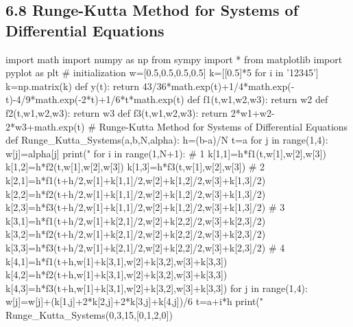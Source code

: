 \documentclass{article}
\begin{document}
\subsection{6.8 Runge-Kutta Method for Systems of Differential Equations}
\begin{python}
import math
import numpy as np
from sympy import *
from matplotlib import pyplot as plt
# initialization
w=[0.5,0.5,0.5,0.5]
k=[[0.5]*5 for i in '12345']
k=np.matrix(k)
def y(t):
    return 43/36*math.exp(t)+1/4*math.exp(-t)-4/9*math.exp(-2*t)+1/6*t*math.exp(t)
def f1(t,w1,w2,w3):
    return w2
def f2(t,w1,w2,w3):
    return w3
def f3(t,w1,w2,w3):
    return 2*w1+w2-2*w3+math.exp(t)
# Runge-Kutta Method for Systems of Differential Equations
def Runge_Kutta_Systems(a,b,N,alpha):
    h=(b-a)/N 
    t=a
    for j in range(1,4):
        w[j]=alpha[j]
    print("%
    for i in range(1,N+1):
        # 1
        k[1,1]=h*f1(t,w[1],w[2],w[3])
        k[1,2]=h*f2(t,w[1],w[2],w[3])
        k[1,3]=h*f3(t,w[1],w[2],w[3])
        # 2
        k[2,1]=h*f1(t+h/2,w[1]+k[1,1]/2,w[2]+k[1,2]/2,w[3]+k[1,3]/2)
        k[2,2]=h*f2(t+h/2,w[1]+k[1,1]/2,w[2]+k[1,2]/2,w[3]+k[1,3]/2)
        k[2,3]=h*f3(t+h/2,w[1]+k[1,1]/2,w[2]+k[1,2]/2,w[3]+k[1,3]/2)
        # 3
        k[3,1]=h*f1(t+h/2,w[1]+k[2,1]/2,w[2]+k[2,2]/2,w[3]+k[2,3]/2)
        k[3,2]=h*f2(t+h/2,w[1]+k[2,1]/2,w[2]+k[2,2]/2,w[3]+k[2,3]/2)
        k[3,3]=h*f3(t+h/2,w[1]+k[2,1]/2,w[2]+k[2,2]/2,w[3]+k[2,3]/2)
        # 4
        k[4,1]=h*f1(t+h,w[1]+k[3,1],w[2]+k[3,2],w[3]+k[3,3])
        k[4,2]=h*f2(t+h,w[1]+k[3,1],w[2]+k[3,2],w[3]+k[3,3])
        k[4,3]=h*f3(t+h,w[1]+k[3,1],w[2]+k[3,2],w[3]+k[3,3])
        for j in range(1,4):
            w[j]=w[j]+(k[1,j]+2*k[2,j]+2*k[3,j]+k[4,j])/6
        t=a+i*h 
        print("%
Runge_Kutta_Systems(0,3,15,[0,1,2,0])
\end{python}

   
\end{document}
